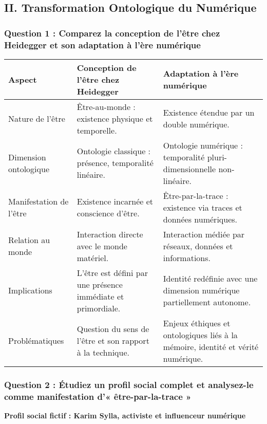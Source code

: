 \documentclass[12pt, a4paper]{article}
\begin{document}
	\subsection*{II. Transformation Ontologique du Numérique}
	
	\subsubsection*{Question 1 : Comparez la conception de l'être chez Heidegger et son adaptation à l'ère numérique}
	
	\begin{table}[H]
		\centering
		\begin{tabular}{|p{3cm}|p{4.5cm}|p{4.5cm}|}
			\hline
			\textbf{Aspect} & \textbf{Conception de l'être chez Heidegger} & \textbf{Adaptation à l'ère numérique} \\
			\hline
			Nature de l'être & Être-au-monde : existence physique et temporelle. & Existence étendue par un double numérique. \\
			\hline
			Dimension ontologique & Ontologie classique : présence, temporalité linéaire. & Ontologie numérique : temporalité pluri-dimensionnelle non-linéaire. \\
			\hline
			Manifestation de l'être & Existence incarnée et conscience d'être. & Être-par-la-trace : existence via traces et données numériques. \\
			\hline
			Relation au monde & Interaction directe avec le monde matériel. & Interaction médiée par réseaux, données et informations. \\
			\hline
			Implications & L'être est défini par une présence immédiate et primordiale. & Identité redéfinie avec une dimension numérique partiellement autonome. \\
			\hline
			Problématiques & Question du sens de l'être et son rapport à la technique. & Enjeux éthiques et ontologiques liés à la mémoire, identité et vérité numérique. \\
			\hline
		\end{tabular}
	\end{table}
	
	\subsubsection*{Question 2 : Étudiez un profil social complet et analysez-le comme manifestation d'« être-par-la-trace »}
	
	\textbf{Profil social fictif : Karim Sylla, activiste et influenceur numérique}
	
\end{document}
